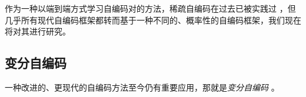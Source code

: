 \documentclass[../../book-main_zh.tex]{subfiles}
\begin{document}
作为一种以端到端方式学习自编码对的方法，稀疏自编码在过去已被实践过
\cite{Ranzato2006-oq,10.5555/3042573.3042641}，但几乎所有现代自编码框架都转而基于一种不同的、概率性的自编码框架，我们现在将对其进行研究。

\subsection{变分自编码}\label{sec:vae}

一种改进的、更现代的自编码方法至今仍有重要应用，那就是\textit{变分自编码}
\cite{Kingma2013-sb,Kingma2019-zh}。
%
\end{document}
